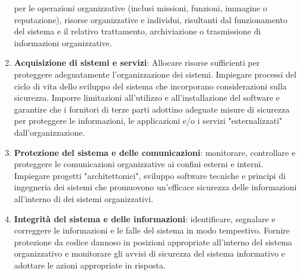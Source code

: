 \begin{enumerate}
            per le operazioni organizzative (inclusi missioni, funzioni, immagine o
            reputazione), risorse organizzative e individui, risultanti dal funzionamento
            del sistema e il relativo trattamento, archiviazione o trasmissione di
            informazioni organizzative.
      \item \textbf{Acquisizione di sistemi e servizi}: Allocare risorse sufficienti
            per proteggere adeguatamente l'organizzazione dei sistemi. Impiegare
            processi del ciclo di vita dello sviluppo del sistema che incorporano
            considerazioni sulla sicurezza. Imporre limitazioni all'utilizzo e
            all'installazione del software e garantire che i fornitori di terze parti
            adottino adeguate misure di sicurezza per proteggere le informazioni, le
            applicazioni e/o i servizi "esternalizzati" dall'organizzazione.
      \item \textbf{Protezione del sistema e delle comunicazioni}: monitorare,
            controllare e proteggere le comunicazioni organizzative ai confini
            esterni e interni. Impiegare progetti "architettonici", sviluppo software
            tecniche e principi di ingegneria dei sistemi che promuovono un'efficace
            sicurezza delle informazioni all'interno di dei sistemi organizzativi.
      \item \textbf{Integrità del sistema e delle informazioni}: identificare,
            segnalare e correggere le informazioni e le falle del sistema in modo
            tempestivo. Fornire protezione da codice dannoso in posizioni appropriate
            all'interno del sistema organizzativo e monitorare gli avvisi di sicurezza
            del sistema informativo e adottare le azioni appropriate in risposta.
\end{enumerate}